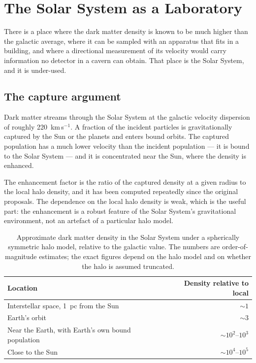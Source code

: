
\chapter{The Solar System as a Laboratory}
\label{ch:solarsystem}

There is a place where the dark matter density is known to be much higher
than the galactic average, where it can be sampled with an apparatus that
fits in a building, and where a directional measurement of its velocity
would carry information no detector in a cavern can obtain. That place is
the Solar System, and it is under-used.

\section{The capture argument}Dark matter streams through the Solar System at the
galactic velocity dispersion of roughly 220~km\,s$^{-1}$. A fraction of
the incident particles is gravitationally captured by the Sun or the planets
and enters bound orbits. The captured population has a much lower velocity
than the incident population --- it is bound to the Solar System --- and it
is concentrated near the Sun, where the density is enhanced.

The enhancement factor is the ratio of the captured density at a given radius
to the local halo density, and it has been computed repeatedly since the
original proposals. The dependence on the local halo density is weak, which
is the useful part: the enhancement is a robust feature of the Solar System's
gravitational environment, not an artefact of a particular halo model.

\begin{table}[H]
\centering
\caption{Approximate dark matter density in the Solar System under a
spherically symmetric halo model, relative to the galactic value. The
numbers are order-of-magnitude estimates; the exact figures depend on the
halo model and on whether the halo is assumed truncated.}
\label{tab:solarsystem}
\begin{tabular}{@{}>{\RaggedRight\arraybackslash}p{}r@{}}
\toprule
\textbf{Location} & \textbf{Density relative to local} \\
\midrule
Interstellar space, 1~pc from the Sun & $\sim 1$ \\
Earth's orbit & $\sim 3$ \\
Near the Earth, with Earth's own bound population & $\sim 10^{2}$--$10^{3}$ \\
Close to the Sun & $\sim 10^{4}$--$10^{5}$ \\
\bottomrule
\end{tabular}
\end{table}


